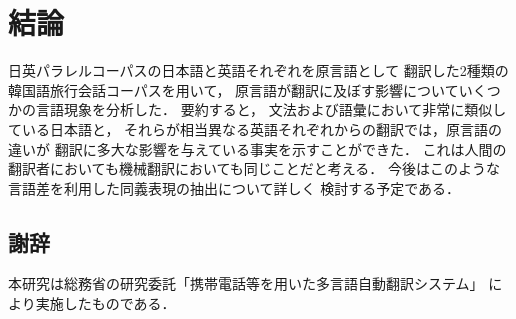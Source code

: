 \section{結論}
\label{sec:conclusion}

日英パラレルコーパスの日本語と英語それぞれを原言語として
翻訳した2種類の韓国語旅行会話コーパスを用いて，
原言語が翻訳に及ぼす影響についていくつかの言語現象を分析した．
要約すると，
文法および語彙において非常に類似している日本語と，
それらが相当異なる英語それぞれからの翻訳では，原言語の違いが
翻訳に多大な影響を与えている事実を示すことができた．
これは人間の翻訳者においても機械翻訳においても同じことだと考える．
今後はこのような言語差を利用した同義表現の抽出について詳しく
検討する予定である．

\subsection*{謝辞}
本研究は総務省の研究委託「携帯電話等を用いた多言語自動翻訳システム」
により実施したものである．

